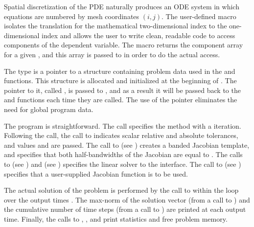Spatial discretization of the PDE naturally produces an ODE system in
which equations are numbered by mesh coordinates $(i,j)$. The
user-defined macro  isolates the translation for the
mathematical two-dimensional index to the one-dimensional
 index and allows the user to write clean, readable code
to access components of the dependent variable.  The 
macro returns the component array for a given , and this
array is passed to  in order to do the actual 
access.

The type  is a pointer to a structure containing problem
data used in the  and  functions.  This structure is
allocated and initialized at the beginning of . The pointer
to it, called , is passed to , and as a
result it will be passed back to the  and  functions
each time they are called.  The use of the  pointer
eliminates the need for global program data.

The  program is straightforward.  The  call specifies
the  method with a  iteration. Following the
 call, the call to  indicates scalar
relative and absolute tolerances, and values  and  are passed.
The call to  (see ) creates a
banded {\sunmatrix} Jacobian template, and specifies that both
half-bandwidths of the Jacobian are equal to .  The calls to
 (see ) and
 (see ) specifies
the {\sunlinsolband} linear solver to the {\cvdls} interface.
The call to  (see ) specifies
that a user-supplied Jacobian function  is to be used.

The actual solution of the problem is performed by
the call to  within the loop over the output times .
The max-norm of the solution vector (from a call to ) and
the cumulative number of time steps (from a call to ) are
printed at each output time. Finally, the calls to ,
, and  print statistics and free problem memory.


